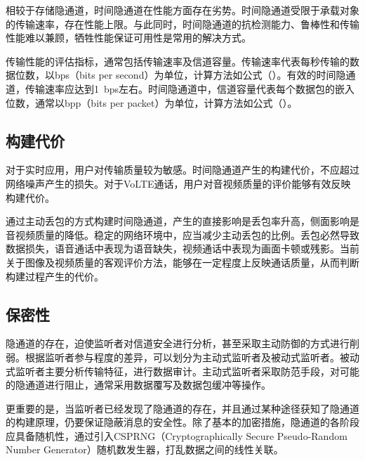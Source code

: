 相较于存储隐通道，时间隐通道在性能方面存在劣势。时间隐通道受限于承载对象的传输速率，存在性能上限。与此同时，时间隐通道的抗检测能力、鲁棒性和传输性能难以兼顾，牺牲性能保证可用性是常用的解决方式。

传输性能的评估指标，通常包括传输速率及信道容量。传输速率代表每秒传输的数据位数，以bps（bits per second）为单位，计算方法如公式（）。有效的时间隐通道，传输速率应达到{1\ bps}左右。时间隐通道中，信道容量代表每个数据包的嵌入位数，通常以bpp（bits per packet）为单位，计算方法如公式（）。

\subsection{构建代价}
\label{chap:backinfo:metric:cost}

对于实时应用，用户对传输质量较为敏感。时间隐通道产生的构建代价，不应超过网络噪声产生的损失。对于VoLTE通话，用户对音视频质量的评价能够有效反映构建代价。

通过主动丢包的方式构建时间隐通道，产生的直接影响是丢包率升高，侧面影响是音视频质量的降低。稳定的网络环境中，应当减少主动丢包的比例。丢包必然导致数据损失，语音通话中表现为语音缺失，视频通话中表现为画面卡顿或残影。当前关于图像及视频质量的客观评价方法，能够在一定程度上反映通话质量，从而判断构建过程产生的代价。

\subsection{保密性}
\label{chap:backinfo:metric:non-disclosure}

隐通道的存在，迫使监听者对信道安全进行分析，甚至采取主动防御的方式进行削弱。根据监听者参与程度的差异，可以划分为主动式监听者及被动式监听者。被动式监听者主要分析传输特征，进行数据审计。主动式监听者采取防范手段，对可能的隐通道进行阻止，通常采用数据覆写及数据包缓冲等操作。

更重要的是，当监听者已经发现了隐通道的存在，并且通过某种途径获知了隐通道的构建原理，仍要保证隐蔽消息的安全性。除了基本的加密措施，隐通道的各阶段应具备随机性，通过引入CSPRNG（Cryptographically Secure Pseudo-Random Number Generator）随机数发生器，打乱数据之间的线性关联。